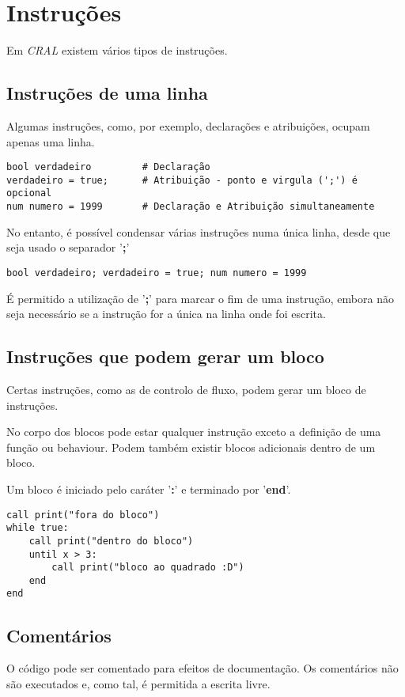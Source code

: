 \documentclass{report}
\begin{document}
\section{Instruções}
Em \textit{CRAL} existem vários tipos de instruções.

\subsection{Instruções de uma linha}

Algumas instruções, como, por exemplo, declarações e atribuições, ocupam apenas uma linha.

\begin{verbatim}
bool verdadeiro         # Declaração
verdadeiro = true;      # Atribuição - ponto e virgula (';') é opcional
num numero = 1999       # Declaração e Atribuição simultaneamente
\end{verbatim}

No entanto, é possível condensar várias instruções numa única linha, desde que seja usado o separador '\textbf{;}'
\begin{verbatim}
bool verdadeiro; verdadeiro = true; num numero = 1999
\end{verbatim}

É permitido a utilização de '\textbf{;}' para marcar o fim de uma instrução, embora não seja necessário se a instrução for a única na linha onde foi escrita.

\subsection{Instruções que podem gerar um bloco}
Certas instruções, como as de controlo de fluxo, podem gerar um bloco de instruções.

No corpo dos blocos pode estar qualquer instrução exceto a definição de uma função ou behaviour.
Podem também existir blocos adicionais dentro de um bloco.

Um bloco é iniciado pelo caráter '\textbf{:}' e terminado por '\textbf{end}'.

\begin{verbatim}
call print("fora do bloco")
while true:
    call print("dentro do bloco")
    until x > 3:
        call print("bloco ao quadrado :D")
    end
end
\end{verbatim}


\subsection{Comentários}
O código pode ser comentado para efeitos de documentação. Os comentários não são executados e, como tal, é permitida a escrita livre.
\end{document}
